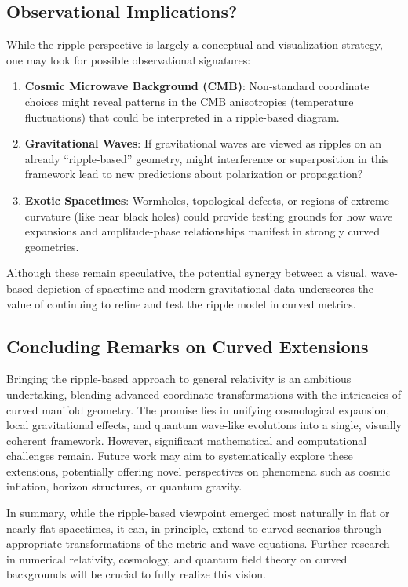 \documentclass{article}
\begin{document}
\subsection{Observational Implications?}
\label{app:subsec:observation}
While the ripple perspective is largely a conceptual and visualization strategy, 
one may look for possible observational signatures:
\begin{enumerate}
  \item \textbf{Cosmic Microwave Background (CMB)}: 
    Non-standard coordinate choices might reveal patterns in the CMB 
    anisotropies (temperature fluctuations) that could be interpreted 
    in a ripple-based diagram.  
  \item \textbf{Gravitational Waves}: 
    If gravitational waves are viewed as ripples on an already 
    “ripple-based” geometry, might interference or superposition 
    in this framework lead to new predictions about polarization 
    or propagation?  
  \item \textbf{Exotic Spacetimes}: 
    Wormholes, topological defects, or regions of extreme curvature 
    (like near black holes) could provide testing grounds for how 
    wave expansions and amplitude-phase relationships manifest in 
    strongly curved geometries.
\end{enumerate}

\noindent
Although these remain speculative, the potential synergy between a 
visual, wave-based depiction of spacetime and modern gravitational 
data underscores the value of continuing to refine and test the 
ripple model in curved metrics.

\subsection{Concluding Remarks on Curved Extensions}
\label{app:subsec:curved-conclusion}
Bringing the ripple-based approach to general relativity is an ambitious 
undertaking, blending advanced coordinate transformations with the 
intricacies of curved manifold geometry. The promise lies in unifying 
cosmological expansion, local gravitational effects, and quantum 
wave-like evolutions into a single, visually coherent framework. 
However, significant mathematical and computational challenges remain. 
Future work may aim to systematically explore these extensions, 
potentially offering novel perspectives on phenomena such as cosmic 
inflation, horizon structures, or quantum gravity.

\bigskip
\noindent
In summary, while the ripple-based viewpoint emerged most naturally in 
flat or nearly flat spacetimes, it can, in principle, extend to curved 
scenarios through appropriate transformations of the metric and wave 
equations. Further research in numerical relativity, cosmology, and 
quantum field theory on curved backgrounds will be crucial to fully 
realize this vision.
\end{document}
